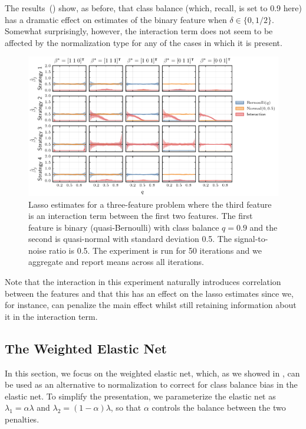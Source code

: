 The results~() show, as before, that class balance (which, recall,
is set to 0.9 here) has a dramatic effect on estimates of the binary feature when \(\delta
\in \{0, 1/2\}\). Somewhat surprisingly, however, the interaction term does not seem to be
affected by the normalization type for any of the cases in which it is present.

\begin{figure}[htpb]
  \label{fig:interactions}
  \centering
  \includegraphics[]{plots/interactions-classbalance.pdf}
  \caption{%
    Lasso estimates for a three-feature problem where the third feature is an interaction term
    between the first two features. The first feature is binary (quasi-Bernoulli) with class
    balance \(q=0.9\) and the second is quasi-normal with standard deviation 0.5. The
    signal-to-noise ratio is 0.5. The experiment is run for 50 iterations and we aggregate and
    report means across all iterations. }
\end{figure}

Note that the interaction in this experiment naturally introduces correlation between the
features and that this has an effect on the lasso estimates since we, for instance, can
penalize the main effect whilst still retaining information about it in the interaction
term.

\subsection{The Weighted Elastic Net}\label{sec:experiments-elasticnet}

In this section, we focus on the weighted elastic net, which, as we showed in
, can be used as an alternative to normalization to correct
for class balance bias in the elastic net. To simplify the presentation, we parameterize
the elastic net as \(\lambda_1 = \alpha \lambda \) and \(\lambda_2 = (1-\alpha) \lambda\),
so that \(\alpha\) controls the balance between the two penalties.

